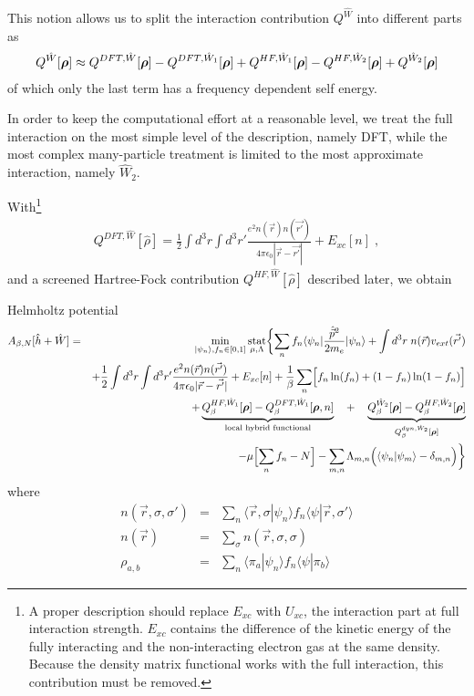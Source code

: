 \documentclass[11pt,a4paper]{report}
\begin{document}
This notion allows us to split the interaction contribution
$Q^{\hat{W}}$ into different parts as
\begin{eqnarray}
Q^{\hat{W}}[\bm{\rho}]
\approx Q^{DFT,\hat{W}}[\bm{\rho}]-Q^{DFT,\hat{W}_1}[\bm{\rho}]
+Q^{HF,\hat{W}_1}[\bm{\rho}]-Q^{HF,\hat{W}_2}[\bm{\rho}]
+Q^{\hat{W}_2}[\bm{\rho}]
\end{eqnarray}
of which only the last term has a frequency dependent self energy.

In order to keep the computational effort at a reasonable level, we
treat the full interaction on the most simple level of the
description, namely DFT, while the most complex many-particle
treatment is limited to the most approximate interaction, namely
$\hat{W}_2$. 

With\footnote{A proper description should replace $E_{xc}$ with
  $U_{xc}$, the interaction part at full interaction
  strength. $E_{xc}$ contains the difference of the kinetic energy of
  the fully interacting and the non-interacting electron gas at the
  same density. Because the density matrix functional works with the
  full interaction, this contribution must be removed.}
\begin{eqnarray}
Q^{DFT,\hat{W}}[\hat{\rho}]=
\frac{1}{2}\int d^3r\int d^3r'
\frac{e^2n(\vec{r})n(\vec{r'})}{4\pi\epsilon_0|\vec{r}-\vec{r'}|}
+E_{xc}[n]\;,
\end{eqnarray}
and a screened Hartree-Fock contribution $Q^{HF,\hat{W}}[\hat{\rho}]$
described later, we obtain
\begin{myshadowminipage}{Helmholtz potential}
\begin{eqnarray}
A_{\beta,N}[\hat{h}+\hat{W}]
&=&\min_{|\psi_n\rangle,f_n\in[0,1]}\operatorname*{stat}_{\mu,\Lambda}
\biggl\lbrace
\sum_n f_n\langle\psi_n|\frac{\hat{\vec{p}}^2}{2m_e}|\psi_n\rangle
+\int d^3r\;n(\vec{r})v_{ext}(\vec{r'})
\nonumber\\
&&+\frac{1}{2}\int d^3r\int d^3r'
\frac{e^2n(\vec{r})n(\vec{r'})}{4\pi\epsilon_0|\vec{r}-\vec{r'}|}
+E_{xc}[n]
+\frac{1}{\beta}\sum_n\Bigl[f_n\ln(f_n)+(1-f_n)\ln(1-f_n)\Bigr]
\nonumber\\
&&+
\underbrace{Q_{\beta}^{HF,\hat{W}_1}[\bm{\rho}]
   -Q_{\beta}^{DFT,\hat{W}_1}[\bm{\rho},n]}_{\text{local hybrid functional}}
\quad+\quad
\underbrace{Q_{\beta}^{\hat{W}_2}[\bm{\rho}]
-Q_{\beta}^{HF,\hat{W}_2}[\bm{\rho}]}
_{Q_{\beta}^{dyn,\hat{W}_2}[\bm{\rho}]}
\nonumber\\
&&
-\mu\Bigl[\sum_n f_n-N\Bigr]
-\sum_{m,n}\Lambda_{m,n}\Bigl(\langle\psi_n|\psi_m\rangle-\delta_{m,n}\Bigr)
\biggr\rbrace
\label{eq:hp}
\end{eqnarray}
where 
\begin{eqnarray}
n(\vec{r},\sigma,\sigma')&=&
\sum_n\langle\vec{r},\sigma|\psi_n\rangle 
f_n\langle\psi|\vec{r},\sigma'\rangle 
\nonumber\\
n(\vec{r})&=&\sum_\sigma n(\vec{r},\sigma,\sigma)
\nonumber\\
\rho_{a,b}&=&\sum_n\langle\pi_a|\psi_n\rangle 
f_n\langle\psi|\pi_b\rangle 
\label{eq:denmatmatel}
\end{eqnarray}
\end{myshadowminipage}
\end{document}
